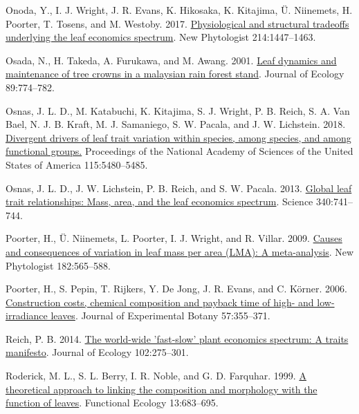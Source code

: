 \documentclass[
  12pt,
  a4paper,
,tablecaptionabove
]{scrartcl}
\newlength{\cslhangindent}
\newenvironment{CSLReferences}[2] %
 {%
  \setlength{\parindent}{0pt}
  \ifodd #1 \everypar{\setlength{\hangindent}{\cslhangindent}}\ignorespaces\fi
  \ifnum #2 > 0
  \setlength{\parskip}{#2\baselineskip}
  \fi
 }%
 {}
\begin{document}
\begin{CSLReferences}{1}{0}
\leavevmode{}%
Onoda, Y., I. J. Wright, J. R. Evans, K. Hikosaka, K. Kitajima, Ü.
Niinemets, H. Poorter, T. Tosens, and M. Westoby. 2017.
\href{https://doi.org/10.1111/nph.14496}{Physiological and structural
tradeoffs underlying the leaf economics spectrum}. New Phytologist
214:1447--1463.

\leavevmode{}%
Osada, N., H. Takeda, A. Furukawa, and M. Awang. 2001.
\href{https://doi.org/10.1046/j.0022-0477.2001.00590.x}{Leaf dynamics
and maintenance of tree crowns in a malaysian rain forest stand}.
Journal of Ecology 89:774--782.

\leavevmode{}%
Osnas, J. L. D., M. Katabuchi, K. Kitajima, S. J. Wright, P. B. Reich,
S. A. Van Bael, N. J. B. Kraft, M. J. Samaniego, S. W. Pacala, and J. W.
Lichstein. 2018.
\href{https://doi.org/10.1073/pnas.1803989115}{Divergent drivers of leaf
trait variation within species, among species, and among functional
groups.} Proceedings of the National Academy of Sciences of the United
States of America 115:5480--5485.

\leavevmode{}%
Osnas, J. L. D., J. W. Lichstein, P. B. Reich, and S. W. Pacala. 2013.
\href{https://doi.org/10.1126/science.1231574}{Global leaf trait
relationships: {Mass}, area, and the leaf economics spectrum}. Science
340:741--744.

\leavevmode{}%
Poorter, H., Ü. Niinemets, L. Poorter, I. J. Wright, and R. Villar.
2009. \href{https://doi.org/10.1111/j.1469-8137.2009.02830.x}{Causes and
consequences of variation in leaf mass per area ({LMA}): {A}
meta-analysis}. New Phytologist 182:565--588.

\leavevmode{}%
Poorter, H., S. Pepin, T. Rijkers, Y. De Jong, J. R. Evans, and C.
Körner. 2006. \href{https://doi.org/10.1093/jxb/erj002}{Construction
costs, chemical composition and payback time of high- and low-irradiance
leaves}. Journal of Experimental Botany 57:355--371.

\leavevmode{}%
Reich, P. B. 2014. \href{https://doi.org/10.1111/1365-2745.12211}{The
world-wide 'fast-slow' plant economics spectrum: {A} traits manifesto}.
Journal of Ecology 102:275--301.

\leavevmode{}%
Roderick, M. L., S. L. Berry, I. R. Noble, and G. D. Farquhar. 1999.
\href{https://doi.org/10.1046/j.1365-2435.1999.00368.x}{A theoretical
approach to linking the composition and morphology with the function of
leaves}. Functional Ecology 13:683--695.


\end{CSLReferences}
\end{document}
